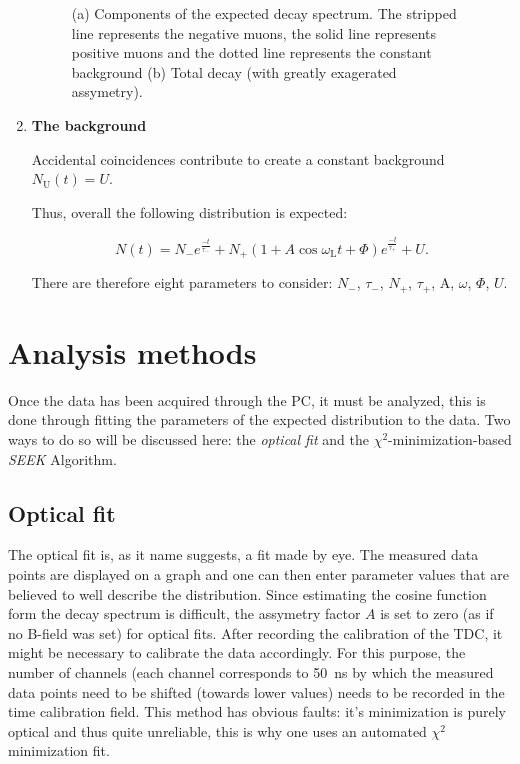\begin{enumerate}
\begin{figure}
\begin{subfigure}[t]{0.49\linewidth}
  \caption{}
\label{sfig:wigl2}
  \end{subfigure}
\caption{(a) Components of the expected decay spectrum. The stripped line represents the negative muons, the solid line represents positive muons and the dotted line represents the constant background (b) Total decay (with greatly exagerated assymetry).}
\label{fig:wigl}
\end{figure}

\item \textbf{The background}

Accidental coincidences contribute to create a constant background $N_{\text{U}}(t)=U$.

Thus, overall the following distribution is expected:

\begin{equation}
N(t)=N_{-}e^{\frac{-t}{\tau_{-}}}+N_{+}(1+A\cos{\omega_{\text{L}}t+\Phi})e^{\frac{-t}{\tau_{+}}}+U.
\end{equation}

There are therefore eight parameters to consider: $N_{-}$, $\tau_{-}$, $N_{+}$, $\tau_{+}$, A, $\omega$, $\Phi$, $U$.

\end{enumerate}

\section{Analysis methods}

Once the data has been acquired through the PC, it must be analyzed, this is done through fitting the parameters of the expected distribution to the data. Two ways to do so will be discussed here: the \textit{optical fit} and the $\chi^2$-minimization-based \textit{SEEK} Algorithm.

\subsection{Optical fit}

The optical fit is, as it name suggests, a fit made by eye. The measured data points are displayed on a graph and one can then enter parameter values that are believed to well describe the distribution. Since estimating the cosine function form the \APmuon decay spectrum is difficult, the assymetry factor $A$ is set to zero (as if no B-field was set) for optical fits. After recording the calibration of the TDC, it might be necessary to calibrate the data accordingly. For this purpose, the number of channels (each channel corresponds to \SI{50}{\nano\second} by which the measured data points need to be shifted (towards lower values) needs to be recorded in the time calibration field. This method has obvious faults: it's minimization is purely optical and thus quite unreliable, this is why one uses an automated $\chi^2$ minimization fit.

